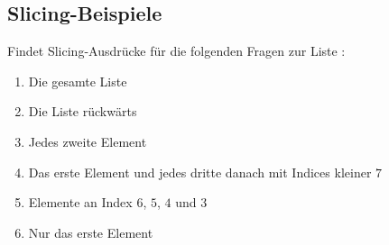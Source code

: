 \subsection{Slicing-Beispiele }

Findet Slicing-Ausdrücke für die folgenden Fragen zur Liste :

\begin{enumerate}
    \item Die gesamte Liste
    \item Die Liste rückwärts
    \item Jedes zweite Element
    \item Das erste Element und jedes dritte danach mit Indices kleiner $7$
    \item Elemente an Index $6$, $5$, $4$ und $3$
    \item Nur das erste Element
\end{enumerate}
